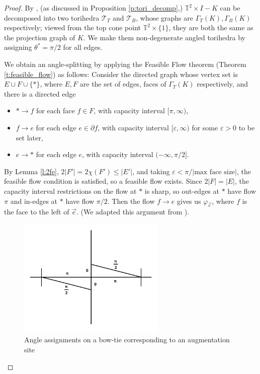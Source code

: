 \documentclass[11pt]{amsart}
\newcommand{\thmref}[1]{Theorem \ref{#1}}
\newcommand{\prpref}[1]{Proposition \ref{#1}}
\newcommand{\lemref}[1]{Lemma \ref{#1}}
\newcommand{\torus}{{\mathbb{T}^2}}
\newcommand{\sT}{{\mathcal{T}}}
\newcommand{\del}{\partial}
\newcommand{\vphi}{\varphi}
\newcommand{\veps}{\varepsilon}
\newcommand{\toruscomp}[1]{{\torus \times I - #1}}
\theoremstyle{plain}
\theoremstyle{definition}
\begin{document}
\begin{proof}
By \cite[Theorem 7.5]{CKP2},
(as discussed in \prpref{p:tori_decomp},)
$\toruscomp{K}$ can be decomposed
into two torihedra $\sT_T$ and $\sT_B$,
whose graphs are $\Gamma_T(K), \Gamma_B(K)$ respectively;
viewed from the top cone point $\torus \times \{1\}$,
they are both the same as the projection graph of $K$.
We make them non-degenerate angled torihedra by assigning $\theta^* = \pi/2$
for all edges.

We obtain an angle-splitting by applying the
Feasible Flow theorem (\thmref{t:feasible_flow}) as follows:
Consider the directed graph whose vertex set is
$E \cup F \cup \{*\}$,
where $E, F$ are the set of edges, faces of $\Gamma_T(K)$ respectively,
and there is a directed edge
\begin{itemize}
\item $* \to f$ for each face $f\in F$, with capacity interval
	$[\pi, \infty)$,
\item $f \to e$ for each edge $e \in \del f$,
	with capacity interval $[\veps, \infty)$
	for some $\veps>0$ to be set later,
\item $e \to *$ for each edge $e$, with capacity interval
	$(-\infty, \pi/2]$.
\end{itemize}
By \lemref{l:2fe}, $2|F'| = 2\chi(F') \leq |E'|$,
and taking $\veps < \pi / |\text{max face size}|$,
the feasible flow condition is satisfied,
so a feasible flow exists.
Since $2|F| = |E|$, the capacity interval restrictions
on the flow at $*$ is sharp, so out-edges at $*$
have flow $\pi$ and in-edges at $*$ have flow $\pi/2$.
Then the flow $f \to e$ gives us $\vphi_{\vec{e}}$,
where $f$ is the face to the left of $\vec{e}$.
(We adapted this argument from \cite{BandS}).


\begin{figure}
\includegraphics[width=7cm]{more_pictures/horizontal_bowtie.png}
\caption{Angle assignments on a bow-tie corresponding to an augmentation site}
\label{f:bowtie_angles}
\end{figure}


\end{proof}
\end{document}
